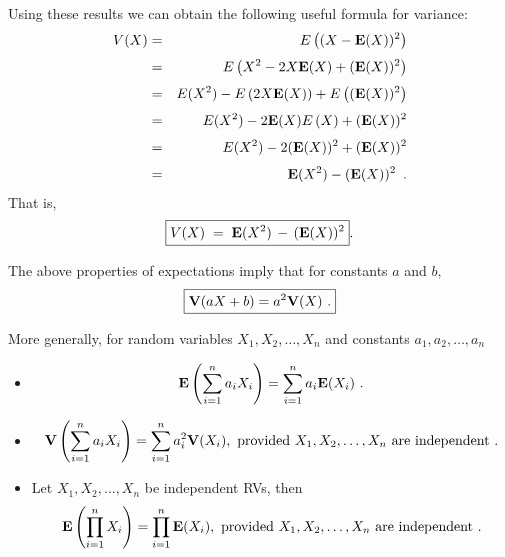 Using these results we can obtain the following useful formula for variance:
\begin{eqnarray*}
V(X)
&=& E\left((X-\mathbf{E}(X))^2\right)\\[3pt]
& =& E \left( X^2 - 2 X \mathbf{E}(X) + (\mathbf{E}(X))^2 \right) \\[3pt]
&=& E ( X^2) - E \left( 2 X \mathbf{E}(X) \right) + E \left( (\mathbf{E}(X))^2
\right)\\[3pt]
& =& E ( X^2) - 2 \mathbf{E}(X) E \left( X \right) + (\mathbf{E}(X))^2 \\[3pt]
&=& E ( X^2) - 2 (\mathbf{E}(X))^2 + (\mathbf{E}(X))^2\\[3pt]
&=& \mathbf{E}(X^2) - (\mathbf{E}(X))^2 \enspace .
\end{eqnarray*}
That is, \[
\boxed{
V(X) \;=\; \mathbf{E}(X^2) \,- \,(\mathbf{E}(X))^2
}.
\]

The above properties of expectations imply that for constants $a$ and $b$,
\begin{equation}\label{E:VofAffineofRVs}
\boxed{
\mathbf{V}(aX+b) = a^2\mathbf{V}(X) \ . 
}
\end{equation}

More generally, for random variables $X_1,X_2,\ldots,X_n$ and constants $a_1,a_2,\ldots,a_n$
\begin{itemize}
\item
\begin{equation}\label{E:EofLinCombofRVs}
\e \left( \sum_{i=1}^n a_i X_i \right) = \sum_{i=1}^n a_i \e(X_i) \ .
\end{equation}
\item
\begin{equation}\label{E:VofLinCombofRVs}
\V \left(  \sum_{i=1}^n a_i X_i \right) = \sum_{i=1}^n a_i^2 \V(X_i) , \text{ provided $X_1,X_2,\ldots,X_n$ are independent}\ .
\end{equation}
\item Let $X_1,X_2,\ldots,X_n$ be independent RVs, then
\begin{equation}\label{E:EofProdIndRVs}
\mathbf{E} \left(  \prod_{i=1}^n X_i \right) = \prod_{i=1}^{n} \mathbf{E}(X_i) , \text{ provided $X_1,X_2,\ldots,X_n$ are independent}\ .
\end{equation}
\end{itemize}


